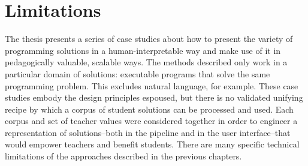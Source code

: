 

\section{Limitations}

The thesis presents a series of case studies about how to present the variety of programming solutions in a human-interpretable way and make use of it in pedagogically valuable, scalable ways. The methods described only work in a particular domain of solutions: executable programs that solve the same programming problem. This excludes natural language, for example. These case studies embody the design principles espoused, but there is no validated unifying recipe by which a corpus of student solutions can be processed and used. Each corpus and set of teacher values were considered together in order to engineer a representation of solutions--both in the pipeline and in the user interface--that would empower teachers and benefit students. There are many specific technical limitations of the approaches described in the previous chapters. %


